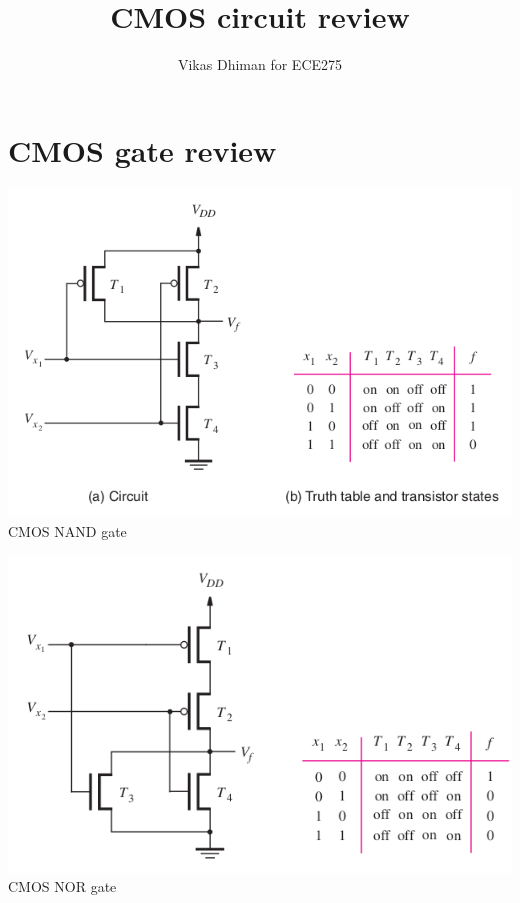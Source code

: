 \documentclass{article}
\title{CMOS circuit review}
\author{Vikas Dhiman for ECE275}
\begin{document}
\maketitle
\section{CMOS gate review}

\begin{minipage}{0.45\linewidth}
\includegraphics[width=\linewidth]{./fig/cmos-nand.png} \\
CMOS NAND gate
\end{minipage}
\begin{minipage}{0.45\linewidth}
\includegraphics[width=\linewidth]{./fig/cmos-nor.png} \\
CMOS NOR gate
\end{minipage}\\
\end{document}
